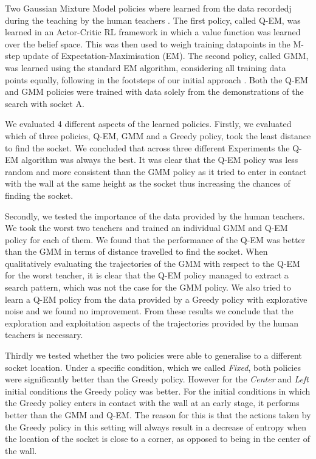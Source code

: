 Two Gaussian Mixture Model policies where learned from the data recordedj during the teaching by the human teachers . 
The first policy, called Q-EM, was learned in an Actor-Critic RL framework in which a value function was learned over 
the belief space. This was then used to weigh training datapoints in the M-step update of Expectation-Maximisation (EM). The second 
policy, called GMM, was learned using the standard EM algorithm, considering all training data points equally,
following in the footsteps of our initial approach \cite{Chambrier2014}. Both the Q-EM and GMM policies were trained 
with data solely from the demonstrations of the search with socket A.

We evaluated 4 different aspects of the learned policies. Firstly, we evaluated which of three policies, Q-EM, GMM and a Greedy policy, 
took the least distance to find the socket. We concluded that across three different Experiments the Q-EM algorithm was always 
the best. It was clear that the Q-EM policy was less random and more consistent than the GMM policy as it tried to enter in 
contact with the wall at the same height as the socket thus increasing the chances of finding the socket.

Secondly, we tested the importance of the data provided by the human teachers. We took the worst two teachers and trained an
individual GMM and Q-EM policy for each of them. We found that the performance of the Q-EM was better than the GMM in terms 
of distance travelled to find the socket. When qualitatively evaluating the trajectories of the GMM with respect to the 
Q-EM for the worst teacher, it is clear that the Q-EM policy managed to extract a search pattern, which was not the case 
for the GMM policy. We also tried to learn a Q-EM policy from the data provided by a Greedy policy with explorative noise 
and we found no improvement. From these results we conclude that the exploration and exploitation aspects of the trajectories 
provided by the human teachers is necessary.

Thirdly we tested whether the two policies were able to generalise to a different socket location. Under a specific condition,
which we called \textit{Fixed}, both policies were significantly better than the Greedy policy. However for the \textit{Center}
and \textit{Left} initial conditions the Greedy policy was better. For the initial conditions in which the Greedy policy 
enters in contact with the wall at an early stage, it performs better than the GMM and Q-EM.  The reason for this is that  
the actions taken by the Greedy policy in this setting will always result in a decrease of entropy when the location
of the socket is close to a corner, as opposed to being in the center of the wall.

